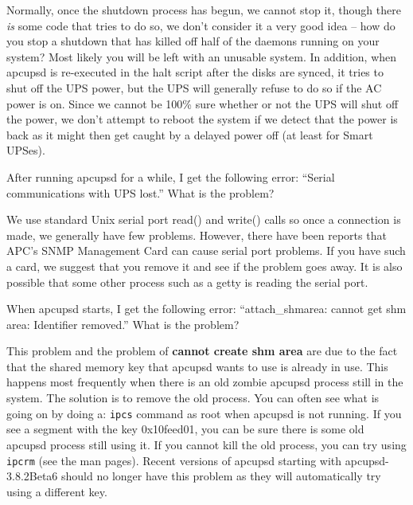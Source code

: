 {{{{{{\begin{description}
{{\item [A:]
   Normally, once the shutdown process has begun, we cannot stop it, though there
{\it is} some code that tries to do so, we don't consider it a very good idea
{--} how do you stop a shutdown that has killed off half of the daemons
running on your system? Most likely you will be left with an unusable system.
In addition, when apcupsd is re-executed in the halt script after the disks
are synced, it tries to shut off the UPS power, but the UPS will generally
refuse to do so if the AC power is on. Since we cannot be 100\% sure whether
or not the UPS will shut off the power, we don't attempt to reboot the system
if we detect that the power is back as it might then get caught by a delayed
power off (at least for Smart UPSes).  

\item [Q:]
   After running apcupsd for a while, I get the following error: ``Serial
communications with UPS lost.'' What is the problem?  

\item [A:]
   We use standard Unix serial port read() and write() calls so once a connection
is made, we generally have few problems. However, there have been reports that
APC's SNMP Management Card can cause serial port problems. If you have such a
card, we suggest that you remove it and see if the problem goes away. It is
also possible that some other process such as a getty is reading the serial
port.  

\item [Q:]
   When apcupsd starts, I get the following error: ``attach\_shmarea: cannot get
shm area: Identifier removed.'' What is the problem?  

\item [A:]
   This problem and the problem of {\bf cannot create shm area} are due to the
fact that the shared memory key that apcupsd wants to use is already in use.
This happens most frequently when there is an old zombie apcupsd process still
in the system.  The solution is to remove the old process.  You can often see
what is going on by doing a: {\tt ipcs} command as root when apcupsd is not
running. If you see a segment with the key 0x10feed01, you can be sure there
is some old apcupsd process still using it. If you cannot kill the old
process, you can try using {\tt ipcrm} (see the man pages).  Recent versions
of apcupsd starting with apcupsd-3.8.2Beta6 should no longer have this problem
as they will automatically try using a different key.  

}}
\end{description}}}}}}}
